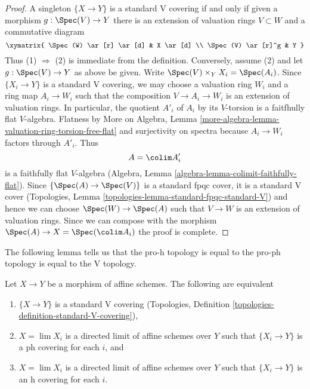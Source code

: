 \begin{proof}
A singleton $\{X \to Y\}$ is a standard V covering if and only if
given a morphism $g : \Spec(V) \to Y$ there is an extension of
valuation rings $V \subset W$ and a commutative diagram
$$
\xymatrix{
\Spec(W) \ar[r] \ar[d] & X \ar[d] \\
\Spec(V) \ar[r]^g & Y
}
$$
Thus (1) $\Rightarrow$ (2) is immediate from the definition.
Conversely, assume (2) and let $g : \Spec(V) \to Y$ as above
be given. Write $\Spec(V) \times_Y X_i = \Spec(A_i)$.
Since $\{X_i \to Y\}$ is a standard V covering, we may choose
a valuation ring $W_i$ and a ring map $A_i \to W_i$ such that
the composition $V \to A_i \to W_i$ is an extension of valuation
rings. In particular, the quotient $A'_i$ of $A_i$ by its
$V$-torsion is a faitfhully flat $V$-algebra. Flatness by
More on Algebra, Lemma
\ref{more-algebra-lemma-valuation-ring-torsion-free-flat} and
surjectivity on spectra because $A_i \to W_i$ factors through $A'_i$.
Thus
$$
A = \colim A'_i
$$
is a faithfully flat $V$-algebra
(Algebra, Lemma \ref{algebra-lemma-colimit-faithfully-flat}).
Since $\{\Spec(A) \to \Spec(V)\}$ is a standard fpqc cover, it
is a standard V cover
(Topologies, Lemma \ref{topologies-lemma-standard-fpqc-standard-V})
and hence we can choose $\Spec(W) \to \Spec(A)$ such that
$V \to W$ is an extension of valuation rings. Since we can compose
with the morphism $\Spec(A) \to X = \Spec(\colim A_i)$
the proof is complete.
\end{proof}

\noindent
The following lemma tells us that the pro-h topology is equal to the
pro-ph topology is equal to the V topology.

\begin{lemma}
\label{lemma-pro-h-V}
Let $X \to Y$ be a morphism of affine schemes. The following are equivalent
\begin{enumerate}
\item $\{X \to Y\}$ is a standard V covering
(Topologies, Definition \ref{topologies-definition-standard-V-covering}),
\item $X = \lim X_i$ is a directed limit of affine schemes over $Y$
such that $\{X_i \to Y\}$ is a ph covering for each $i$, and
\item $X = \lim X_i$ is a directed limit of affine schemes over $Y$
such that $\{X_i \to Y\}$ is an h covering for each $i$.
\end{enumerate}
\end{lemma}

